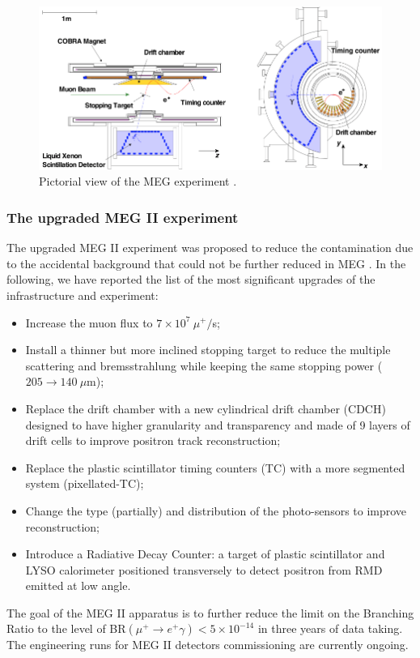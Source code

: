 \documentclass[12pt,a4paper,openright, oneside, titlepage]{book} %
\begin{document}
\begin{figure}[h!]
\centering
\includegraphics[scale=1]{MEG}
\caption{Pictorial view of the MEG experiment \cite{Chiappini}\cite{MEG}.}
\label{_MEG}
\end{figure}

\subsubsection{The upgraded MEG II experiment} 

\noindent
The upgraded MEG II experiment was proposed to reduce the contamination due to the accidental background 
that could not be further reduced in MEG \cite{MEG_upgrade} \cite{MEG_II}.
In the following, we have reported the list of the most significant upgrades of the infrastructure and experiment:

\begin{itemize}
\item Increase the muon flux to $7\times10^7\ \mu^+/$s;
\item Install a thinner but more inclined stopping target to reduce the multiple scattering and bremsstrahlung 
while keeping the same stopping power ($205 \rightarrow 140\ \mu$m);
\item Replace the drift chamber with a new cylindrical drift chamber (CDCH) designed  
to have higher granularity and transparency and made of 9 layers of drift cells to improve positron track reconstruction; 
\item Replace the plastic scintillator timing counters (TC) with a more segmented system (pixellated-TC);
\item Change the type (partially) and distribution of the photo-sensors to improve reconstruction;
\item Introduce a Radiative Decay Counter: a target of plastic scintillator and LYSO calorimeter positioned transversely to detect positron from RMD emitted at low angle.
\end{itemize}
The goal of the MEG II apparatus is to further reduce the limit on the Branching Ratio to the level of BR$(\mu^+\rightarrow e^+\gamma)<5\times10^{-14}$ in three years of data taking. 
The engineering runs for MEG II detectors commissioning are currently ongoing.
\end{document}
